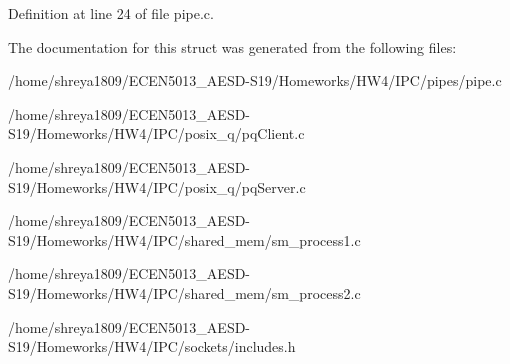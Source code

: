 Definition at line 24 of file pipe.\+c.



The documentation for this struct was generated from the following files\+:\begin{DoxyCompactItemize}
\item 
/home/shreya1809/\+E\+C\+E\+N5013\+\_\+\+A\+E\+S\+D-\/\+S19/\+Homeworks/\+H\+W4/\+I\+P\+C/pipes/pipe.\+c\item 
/home/shreya1809/\+E\+C\+E\+N5013\+\_\+\+A\+E\+S\+D-\/\+S19/\+Homeworks/\+H\+W4/\+I\+P\+C/posix\+\_\+q/pq\+Client.\+c\item 
/home/shreya1809/\+E\+C\+E\+N5013\+\_\+\+A\+E\+S\+D-\/\+S19/\+Homeworks/\+H\+W4/\+I\+P\+C/posix\+\_\+q/pq\+Server.\+c\item 
/home/shreya1809/\+E\+C\+E\+N5013\+\_\+\+A\+E\+S\+D-\/\+S19/\+Homeworks/\+H\+W4/\+I\+P\+C/shared\+\_\+mem/sm\+\_\+process1.\+c\item 
/home/shreya1809/\+E\+C\+E\+N5013\+\_\+\+A\+E\+S\+D-\/\+S19/\+Homeworks/\+H\+W4/\+I\+P\+C/shared\+\_\+mem/sm\+\_\+process2.\+c\item 
/home/shreya1809/\+E\+C\+E\+N5013\+\_\+\+A\+E\+S\+D-\/\+S19/\+Homeworks/\+H\+W4/\+I\+P\+C/sockets/includes.\+h\end{DoxyCompactItemize}
